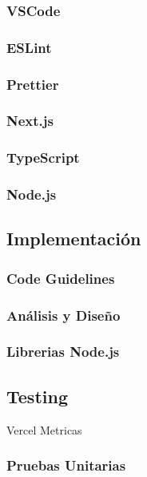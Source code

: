 \documentclass[12pt,twoside,titlepage]{report}
\begin{document}
\subsubsection{VSCode}
\subsubsection{ESLint}
\subsubsection{Prettier}

\subsubsection{Next.js}

\subsubsection{TypeScript}

\subsubsection{Node.js}



\subsection{Implementación}

\subsubsection{Code Guidelines}
\subsubsection{Análisis y Diseño}
\subsubsection{Librerias Node.js}

\subsection{Testing}

Vercel Metricas

\subsubsection{Pruebas Unitarias}
\end{document}
